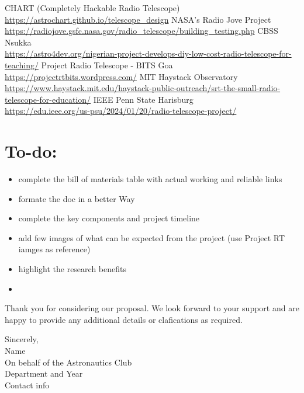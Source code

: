 \documentclass[12pt]{report}
\begin{document}
\begin{thebibliography}{9}
    \label{sec: references}
CHART (Completely Hackable Radio Telescope) \\
\url{https://astrochart.github.io/telescope_design}
NASA's Radio Jove Project \\
\url{https://radiojove.gsfc.nasa.gov/radio_telescope/building_testing.php}
CBSS Nsukka \\
\url{https://astro4dev.org/nigerian-project-develops-diy-low-cost-radio-telescope-for-teaching/}
Project Radio Telescope - BITS Goa \\
\url{https://projectrtbits.wordpress.com/}
MIT Haystack Observatory \\
\url{https://www.haystack.mit.edu/haystack-public-outreach/srt-the-small-radio-telescope-for-education/}
IEEE Penn State Harisburg \\
\url{https://edu.ieee.org/us-psu/2024/01/20/radio-telescope-project/}

\section*{To-do:}
\begin{itemize}
    \item complete the bill of materials table with actual working and reliable links
    \item formate the doc in a better Way
    \item complete the key components and project timeline
    \item add few images of what can be expected from the project (use Project RT iamges as reference)
    \item highlight the research benefits 
    \item 
\end{itemize}

\end{thebibliography}
\begin{flushleft}
    Thank you for considering our proposal. We look forward to your support and are happy to provide any additional details or clafications as required. \\ \vspace{1em}

    Sincerely,\\ 
    Name \\
    On behalf of the Astronautics Club\\
    Department and Year \\
    Contact info
\end{flushleft}
\end{document}
